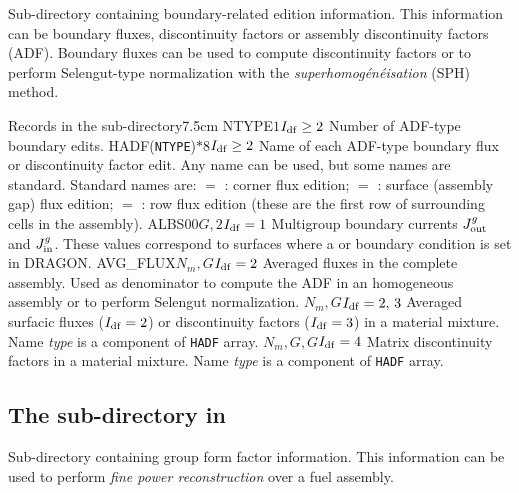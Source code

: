 Sub-directory containing boundary-related edition information. This information can be boundary fluxes, discontinuity factors or
assembly discontinuity factors (ADF). Boundary fluxes can be used to compute discontinuity factors or to perform Selengut-type
normalization with the {\sl superhomog\'en\'eisation} (SPH) method.

\begin{DescriptionEnregistrement}{Records in the  sub-directory}{7.5cm}
\OptIntEnr
  {NTYPE}{$1$}{$I_{\rm df} \ge 2$}
  {Number of ADF-type boundary edits.}
\OptCharEnr
  {HADF}{({\tt NTYPE})$*8$}{$I_{\rm df} \ge 2$}
  {Name of each ADF-type boundary flux or discontinuity factor edit. Any name can be used, but some
  names are standard. Standard names are: $=$ :
  corner flux edition; $=$ : surface (assembly gap) flux edition; $=$ :
  row flux edition (these are the first row of surrounding cells in the assembly).}
\OptRealEnr
  {ALBS00}{$G,2$}{$I_{\rm df} = 1$}{}
  {Multigroup boundary currents $J^{g}_{\rm out}$ and $J^{g}_{\rm in}$. These values correspond to surfaces where
  a  or  boundary condition is set in DRAGON.}
\OptRealEnr
  {AVG\_FLUX}{$N_{m},G$}{$I_{\rm df} = 2$}{}
  {Averaged fluxes in the complete assembly. Used as denominator to compute the ADF in an homogeneous assembly or to perform Selengut normalization.}
\OptRealVar
  {}{$N_{m},G$}{$I_{\rm df} = 2,\, 3$}{}
  {Averaged surfacic fluxes ($I_{\rm df} = 2$) or discontinuity factors ($I_{\rm df} = 3$) in a material mixture. Name {\sl type} is a component of
  {\tt HADF} array.}
\OptRealVar
  {}{$N_{m},G,G$}{$I_{\rm df} = 4$}{}
  {Matrix discontinuity factors in a material mixture. Name {\sl type} is a component of {\tt HADF} array.}
\end{DescriptionEnregistrement}

\subsection{The  sub-directory in }\label{sect:macroGFF}

Sub-directory containing group form factor information. This information can be used to perform
{\sl fine power reconstruction} over a fuel assembly.

